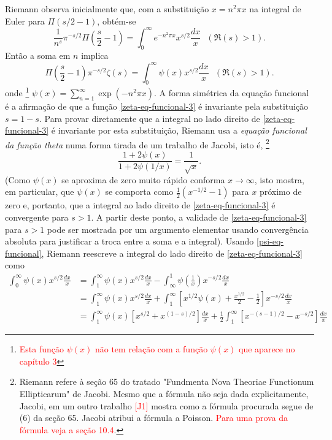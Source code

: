     Riemann observa inicialmente que, com a substituição $x = n^2 \pi x$ na integral de Euler para $\Pi(s/2 - 1)$, obtém-se
    \begin{equation*}
        \frac{1}{n^s} \pi^{-s/2} \Pi \left( \frac{s}{2} - 1 \right) = \int_{0}^{\infty} e^{-n^2 \pi x} x^{s/2} \frac{dx}{x} \ \ \ (\Re(s) > 1).
    \end{equation*}
    Então a soma em $n$ implica
    \begin{equation}
        \label{zeta-eq-funcional-3}
         \Pi \left( \frac{s}{2} - 1 \right) \pi^{-s/2} \zeta(s) = \int_{0}^{\infty} \psi(x) x^{s/2} \frac{dx}{x} \ \ \ (\Re(s) > 1).
    \end{equation}
    onde 
    \footnote{\textcolor{red}{Esta função $\psi(x)$ não tem relação com a função $\psi(x)$ que aparece no capítulo 3}
    }
    $\psi(x) = \sum_{n=1}^{\infty} \exp(-n^2 \pi x)$. A forma simétrica da equação funcional é a afirmação de que a função \eqref{zeta-eq-funcional-3} é invariante pela substituição $s = 1 - s$. Para provar diretamente que a integral no lado direito de \eqref{zeta-eq-funcional-3} é invariante por esta substituição, Riemann usa a \textit{equação funcional da função theta} numa forma tirada de um trabalho de Jacobi, isto é,
    \footnote{Riemann refere à seção 65 do tratado "Fundmenta Nova Theoriae Functionum Ellipticarum" de Jacobi. Mesmo que a fórmula não seja dada explicitamente, Jacobi, em um outro trabalho \textcolor{red}{[J1]} mostra como a fórmula procurada segue de (6) da seção 65. Jacobi atribui a fórmula a Poisson. \textcolor{red}{Para uma prova da fórmula veja a seção 10.4}.
    }
    \begin{equation}
        \label{psi-eq-funcional}
        \frac{1 + 2\psi(x)}{1 + 2\psi(1/x)} = \frac{1}{\sqrt{x}}.
    \end{equation}
    (Como $\psi(x)$ se aproxima de zero muito rápido conforma $x \to \infty$, isto mostra, em particular, que $\psi(x)$ se comporta como $\frac{1}{2}(x^{-1/2} - 1)$ para $x$ próximo de zero e, portanto, que a integral ao lado direito de \eqref{zeta-eq-funcional-3} é convergente para $s>1$. A partir deste ponto, a validade de \eqref{zeta-eq-funcional-3} para $s>1$ pode ser mostrada por um argumento elementar usando convergência absoluta para justificar a troca entre a soma e a integral). Usando \eqref{psi-eq-funcional}, Riemann reescreve a integral do lado direito de \eqref{zeta-eq-funcional-3} como
    \begin{align*}
        \int_{0}^{\infty} \psi(x) x^{s/2} \frac{dx}{x} &=
        \int_{1}^{\infty} \psi(x) x^{s/2} \frac{dx}{x} - \int_{\infty}^{1} \psi \left( \frac{1}{x} \right) x^{-s/2} \frac{dx}{x} 
        \\[0.3cm]
        &= \int_{1}^{\infty} \psi(x) x^{s/2} \frac{dx}{x} + \int_{1}^{\infty} \left[ x^{1/2} \psi(x) + \frac{x^{1/2}}{2} - \frac{1}{2} \right] x^{-s/2} \frac{dx}{x} 
        \\[0.3cm]
        &= \int_{1}^{\infty} \psi(x) [x^{s/2} + x^{(1 - s)/2}] \frac{dx}{x} + \frac{1}{2} \int_{1}^{\infty} [x^{-(s-1)/2} - x^{- s/2}] \frac{dx}{x}
    \end{align*}
